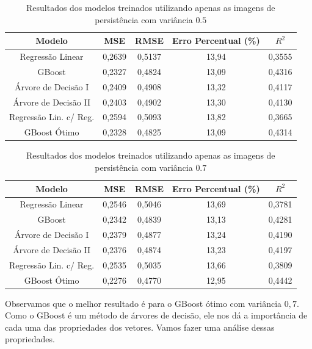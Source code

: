 \begin{table}[htpb!]
\centering
\caption{Resultados dos modelos treinados utilizando apenas as imagens de persistência com variância
$0.5$}
\label{tab:pionly05}
\begin{tabular}{@{}ccccc@{}}
\toprule
Modelo                 & MSE    & RMSE   & Erro Percentual (\%) & $R^2$  \\ \midrule
Regressão Linear       & 0,2639 & 0,5137 & 13,94 & 0,3555 \\
GBoost                 & 0,2327 & 0,4824 & 13,09 & 0,4316 \\
Árvore de Decisão I    & 0,2409 & 0,4908 & 13,32 & 0,4117 \\
Árvore de Decisão II   & 0,2403 & 0,4902 & 13,30 & 0,4130 \\
Regressão Lin. c/ Reg. & 0,2594 & 0,5093 & 13,82 & 0,3665 \\
GBoost Ótimo           & 0,2328 & 0,4825 & 13,09 & 0,4314 \\ \bottomrule
\end{tabular}
\end{table}
\begin{table}[htpb!]
\centering
\caption{Resultados dos modelos treinados utilizando apenas as imagens de persistência com variância
$0.7$}
\label{tab:pionly07}
\begin{tabular}{@{}ccccc@{}}
\toprule
Modelo                 & MSE    & RMSE   & Erro Percentual (\%) & $R^2$  \\ \midrule
Regressão Linear       & 0,2546 & 0,5046 & 13,69 & 0,3781 \\
GBoost                 & 0,2342 & 0,4839 & 13,13 & 0,4281 \\
Árvore de Decisão I    & 0,2379 & 0,4877 & 13,24 & 0,4190 \\
Árvore de Decisão II   & 0,2376 & 0,4874 & 13,23 & 0,4197 \\
Regressão Lin. c/ Reg. & 0,2535 & 0,5035 & 13,66 & 0,3809 \\
GBoost Ótimo           & 0,2276 & 0,4770 & 12,95 & 0,4442 \\ \bottomrule
\end{tabular}
\end{table}
Observamos que o melhor resultado é para o GBoost ótimo com variância $0,7$. Como o GBoost
é um método de árvores de decisão, ele nos dá a importância de cada uma das propriedades
dos vetores. Vamos fazer uma análise dessas propriedades. 

